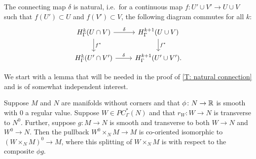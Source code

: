 \begin{comment}
	On the other hand, consider $(N^0 \times_N W) \times_N M = W^0 \times_N M \to M$.
	One again we fix $\beta_N$ and $\beta_W$ so that $\omega_{r_W} = (\beta_W,\beta_N)$.
	Again by \cref{P: codim 1 co-orient}, the co-orientation of the pullback $N^0 \times_N W \to W$ is $(\beta_{W^0},\beta_{W^0} \wedge \beta_\phi)$ for any $\beta_{W^0}$, continuing to let $\beta_\phi$ denote any normal co-orientation pulled back via $\phi$.
	If we choose $\beta_{W^0}$ so that $\beta_{W^0} \wedge \beta_\phi = \beta_W$ then we have $r_{W^0} \colon W^0 \to N$ co-oriented by $(\beta_{W^0},\beta_N)$.
	As $W^0 \subset W$, we can embed $W^0$ in $N \times \R^K$ via the composition $W^0 \into W \xhookrightarrow{e}N \times \R^K$, using the same $e$ and $K$ as above.
	As $\beta_W \wedge \beta_\nu = \beta_N \wedge \beta_E$ and $\beta_W = \beta_{W^0} \wedge \beta_\phi$, we have $\beta_{W^0} \wedge \beta_\phi \wedge \beta_\nu = \beta_N \wedge \beta_E$ so that $\beta_\phi \wedge \beta_\nu$ is the Quillen orientation for the normal bundle of $W^0$ in $N \times \R^K$.
	Using this to pull back $W^0 \to N$ to $W^0 \times_N M \to M$, by definition the pullback co-orientation is $(\beta_Q,\beta_M)$ when $\beta_Q$ and $\beta_M$ are chosen so that $\beta_Q \wedge \beta_\phi \wedge \beta_\nu = \beta_M \wedge \beta_E$.
	But this is exactly the same co-orientation we arrived at in the preceding paragraph.
	Thus the co-orientations of the two constructions agree.

	We conclude that the diagram of the lemma commutes.
\end{proof}
\end{comment}

\begin{theorem}\label{T: natural connection}
	The connecting map $\delta$ is natural, i.e.\ for a continuous map $f \colon U' \cup V' \to U \cup V$ such that $f(U') \subset U$ and $f(V') \subset V$, the following diagram commutes for all $k$:
	\[
	\begin{tikzcd}
		H^k_\Gamma(U \cap V) \arrow[r, "\delta"] \arrow[d, "f^*"] & H^{k+1}_\Gamma(U \cup V) \arrow[d, "f^*"] \\
		H^k_\Gamma(U' \cap V') \arrow[r, "\delta"] & H^{k+1}_\Gamma(U' \cup V').
	\end{tikzcd}
	\]
\end{theorem}

We start with a lemma that will be needed in the proof of \cref{T: natural connection} and is of somewhat independent interest.

\begin{lemma}\label{L: cut pullback}
	Suppose $M$ and $N$ are manifolds without corners and that $\phi \colon N \to \mathbb{R}$ is smooth with $0$ a regular value.
	Suppose $W \in PC^*_\Gamma(N)$ and that $r_W \colon W \to N$ is transverse to $N^0$.
	Further, suppose $g \colon M \to N$ is smooth and transverse to both $W \to N$ and $W^0 \to N$.
	Then the pullback $W^0 \times_N M \to M$ is co-oriented isomorphic to $(W \times_N M)^0 \to M$, where this splitting of $W \times_N M$ is with respect to the composite $\phi g$.
\end{lemma}

